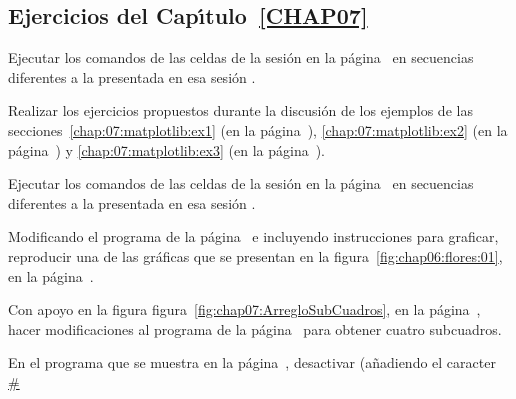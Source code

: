 
\newpage
\begin{appendices}

\renewcommand\thechapter{}
\chapter[Ejercicios del Cap\'{\i}tulo~\ref{CHAP07}]{Ejercicios del 
                        Cap\'{\i}tulo~\ref{CHAP07}}
\label{ejercicios:chap07}

\begin{prob}
\label{chap07:prob1}
Ejecutar los comandos de las celdas 
de la sesión {\ipython} en la 
página~\pageref{code:chap07:matplotlib:ex:01}  
en secuencias diferentes a la presentada en esa sesión {\ipython}.
\end{prob}
%
\begin{prob}
\label{chap07:prob2}
Realizar los ejercicios propuestos durante la discusión
de los ejemplos de las secciones~\ref{chap:07:matplotlib:ex1}
(en la página~\pageref{chap:07:matplotlib:ex1}), \ref{chap:07:matplotlib:ex2} 
(en la página~\pageref{chap:07:matplotlib:ex2}) y \ref{chap:07:matplotlib:ex3}
(en la página~\pageref{chap:07:matplotlib:ex3}).
\end{prob}
%
\begin{prob}
\label{chap07:prob3}
Ejecutar los comandos de las celdas 
de la sesión {\ipython} en la 
página~\pageref{code:chap07:matplotlib:ex:02}  
en secuencias diferentes a la presentada en esa sesión {\ipython}.
\end{prob}
%
\begin{prob}
\label{chap07:prob5}
Modificando el programa de la 
página~\pageref{code:chap06:archivooutput:ex:01}
e incluyendo instrucciones
para graficar, 
reproducir una de las gráficas que se presentan en la 
figura~\ref{fig:chap06:flores:01}, en la
página~\pageref{fig:chap06:flores:01}.
\end{prob}
%
\begin{prob}
\label{chap07:prob6}
Con apoyo en la figura figura~\ref{fig:chap07:ArregloSubCuadros},
en la página~\pageref{fig:chap07:ArregloSubCuadros}, hacer modificaciones
al programa de la página~\pageref{code:chap07:matplotlib:ex:03} 
para obtener cuatro subcuadros.
\end{prob}
%
\begin{prob}
\label{chap07:prob7}
En el programa que se muestra en la 
página~\pageref{code:chap07:matplotlib:ex:03},
desactivar (añadiendo el caracter \url{#} 

\end{prob}
\end{appendices}
